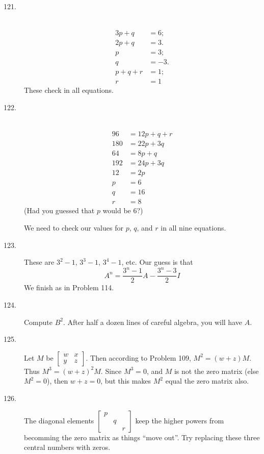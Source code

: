 \documentclass{article}
\begin{document}
\begin{description}
  \item[121.] $\ $
    \begin{align*}
    3p + q & = 6; \\
    2p + q & = 3. \\ 
    p & = 3; \\ 
    q & = -3. \\
    p + q + r & = 1; \\ 
    r & = 1
    \end{align*}
    These check in all equations.

  \item[122.] $\ $
    \begin{align*}
     96 & = 12p + q + r \\
    180 & = 22p + 3q \\
     64 & = 8p + q \\
    192 & = 24p + 3q \\
     12 & = 2p \\
      p & = 6 \\
      q & = 16 \\
      r & = 8
    \end{align*}
    (Had you guessed that $p$ would be $6$?)

    We need to check our values for $p$, $q$, and $r$ in all nine equations.

  \item[123.] These are $3^2 - 1$, $3^3 - 1$, $3^4 - 1$, etc. Our guess is that
    \begin{equation*}
    A^n = \frac{3^n-1}{2} A - \frac{3^n-3}{2} I
    \end{equation*}
    We finish as in Problem 114.

  \item[124.] Compute $B^2$. After half a dozen lines of careful algebra, you will have $A$.

  \item[125.] Let $M$ be $\begin{bmatrix} w & x \\ y & z \end{bmatrix}$. Then according to Problem 109, $M^2 = (w+z)M$. Thus $M^3 = (w+z)^2 M$. Since $M^3 = 0$, and $M$ is not the zero matrix (else $M^2 = 0$), then $w+z = 0$, but this makes $M^2$ equal the zero matrix also.

  \item[126.] The diagonal elements $\begin{bmatrix} p & & \\ & q & \\ & & r \end{bmatrix}$ keep the higher powers from becomming the zero matrix as things ``move out''. Try replacing these three central numbers with zeros.

\end{description}
\end{document}

